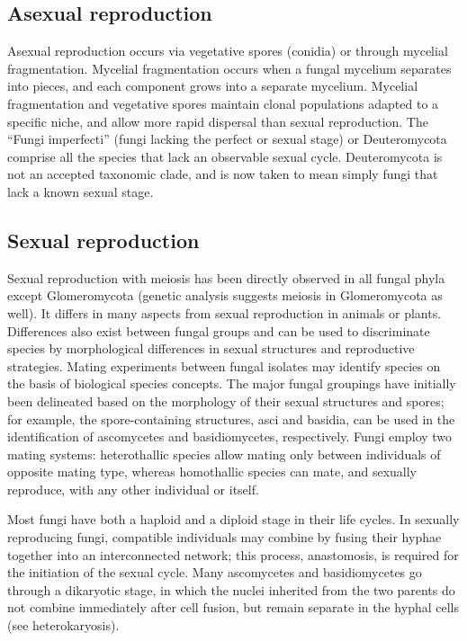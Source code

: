 \hypertarget{asexual-reproduction}{%
\subsection{Asexual reproduction}\label{asexual-reproduction}}

Asexual reproduction occurs via vegetative spores (conidia) or through mycelial fragmentation. Mycelial fragmentation occurs when a fungal mycelium separates into pieces, and each component grows into a separate mycelium. Mycelial fragmentation and vegetative spores maintain clonal populations adapted to a specific niche, and allow more rapid dispersal than sexual reproduction. The ``Fungi imperfecti'' (fungi lacking the perfect or sexual stage) or Deuteromycota comprise all the species that lack an observable sexual cycle. Deuteromycota is not an accepted taxonomic clade, and is now taken to mean simply fungi that lack a known sexual stage.

\hypertarget{sexual-reproduction-1}{%
\subsection{Sexual reproduction}\label{sexual-reproduction-1}}

Sexual reproduction with meiosis has been directly observed in all fungal phyla except Glomeromycota (genetic analysis suggests meiosis in Glomeromycota as well). It differs in many aspects from sexual reproduction in animals or plants. Differences also exist between fungal groups and can be used to discriminate species by morphological differences in sexual structures and reproductive strategies. Mating experiments between fungal isolates may identify species on the basis of biological species concepts. The major fungal groupings have initially been delineated based on the morphology of their sexual structures and spores; for example, the spore-containing structures, asci and basidia, can be used in the identification of ascomycetes and basidiomycetes, respectively. Fungi employ two mating systems: heterothallic species allow mating only between individuals of opposite mating type, whereas homothallic species can mate, and sexually reproduce, with any other individual or itself.

Most fungi have both a haploid and a diploid stage in their life cycles. In sexually reproducing fungi, compatible individuals may combine by fusing their hyphae together into an interconnected network; this process, anastomosis, is required for the initiation of the sexual cycle. Many ascomycetes and basidiomycetes go through a dikaryotic stage, in which the nuclei inherited from the two parents do not combine immediately after cell fusion, but remain separate in the hyphal cells (see heterokaryosis).

